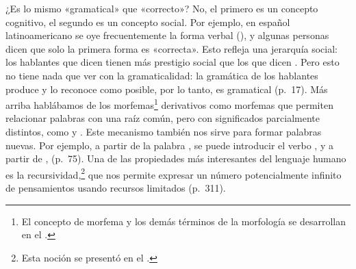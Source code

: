 \begin{exe}
  \ex\label{ex:02-haiga} ¿Es lo mismo «gramatical» que «correcto»? No, el
      primero es un concepto cognitivo, el segundo es un concepto social. Por
      ejemplo, en español latinoamericano se oye frecuentemente la forma verbal
       (), y algunas
      personas dicen que solo la primera forma es «correcta». Esto refleja una
      jerarquía social: los hablantes que dicen  tienen más
      prestigio social que los que dicen . Pero esto no tiene nada
      que ver con la gramaticalidad: la gramática de los hablantes produce
       y lo reconoce como posible, por lo tanto, es gramatical
      (p.~17).
  \ex\label{ex:02-faxear} Más arriba hablábamos de los
      morfemas\footnote{El concepto de morfema y los demás términos de la
      morfología se desarrollan en el .} derivativos como morfemas
      que permiten relacionar palabras con una raíz común, pero con
      significados parcialmente distintos, como  y .
      Este mecanismo también nos sirve para formar palabras nuevas. Por
      ejemplo, a partir de la palabra , se puede introducir el verbo
      , y a partir de ,  (p.~75).
  \ex\label{ex:02-recursividad} Una de las propiedades más interesantes del
      lenguaje humano es la recursividad,\footnote{Esta noción se presentó en
      el .} que nos permite expresar un número potencialmente
      infinito de pensamientos usando recursos limitados (p.~311).
\end{exe}

